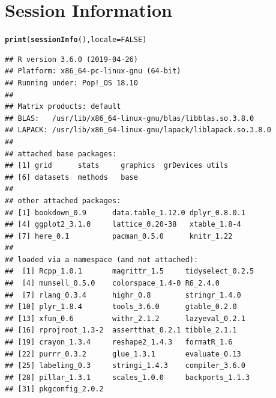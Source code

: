\documentclass[11pt,letter]{article}\usepackage[]{graphicx}\usepackage[]{color}
\makeatletter
\newcommand{\hlnum}[1]{\textcolor[rgb]{0.686,0.059,0.569}{#1}}%
\newcommand{\hlstd}[1]{\textcolor[rgb]{0.345,0.345,0.345}{#1}}%
\newcommand{\hlkwc}[1]{\textcolor[rgb]{0.333,0.667,0.333}{#1}}%
\newcommand{\hlkwd}[1]{\textcolor[rgb]{0.737,0.353,0.396}{\textbf{#1}}}%
\newenvironment{kframe}{%
 \def\at@end@of@kframe{}%
 \ifinner\ifhmode%
  \def\at@end@of@kframe{\end{minipage}}%
  \begin{minipage}{\columnwidth}%
 \fi\fi%
 \def\FrameCommand##1{\hskip\@totalleftmargin \hskip-\fboxsep
 \colorbox{shadecolor}{##1}\hskip-\fboxsep
     \hskip-\linewidth \hskip-\@totalleftmargin \hskip\columnwidth}%
 \MakeFramed {\advance\hsize-\width
   \@totalleftmargin\z@ \linewidth\hsize
   \@setminipage}}%
 {\par\unskip\endMakeFramed%
 \at@end@of@kframe}
\newenvironment{knitrout}{}{} %
\makeatother
\begin{document}
\newpage

\section{Session Information}
\begin{knitrout}
\color{fgcolor}\begin{kframe}
\begin{alltt}
\hlkwd{print}\hlstd{(}\hlkwd{sessionInfo}\hlstd{(),} \hlkwc{locale} \hlstd{=} \hlnum{FALSE}\hlstd{)}
\end{alltt}
\begin{verbatim}
## R version 3.6.0 (2019-04-26)
## Platform: x86_64-pc-linux-gnu (64-bit)
## Running under: Pop!_OS 18.10
## 
## Matrix products: default
## BLAS:   /usr/lib/x86_64-linux-gnu/blas/libblas.so.3.8.0
## LAPACK: /usr/lib/x86_64-linux-gnu/lapack/liblapack.so.3.8.0
## 
## attached base packages:
## [1] grid      stats     graphics  grDevices utils    
## [6] datasets  methods   base     
## 
## other attached packages:
## [1] bookdown_0.9      data.table_1.12.0 dplyr_0.8.0.1    
## [4] ggplot2_3.1.0     lattice_0.20-38   xtable_1.8-4     
## [7] here_0.1          pacman_0.5.0      knitr_1.22       
## 
## loaded via a namespace (and not attached):
##  [1] Rcpp_1.0.1       magrittr_1.5     tidyselect_0.2.5
##  [4] munsell_0.5.0    colorspace_1.4-0 R6_2.4.0        
##  [7] rlang_0.3.4      highr_0.8        stringr_1.4.0   
## [10] plyr_1.8.4       tools_3.6.0      gtable_0.2.0    
## [13] xfun_0.6         withr_2.1.2      lazyeval_0.2.1  
## [16] rprojroot_1.3-2  assertthat_0.2.1 tibble_2.1.1    
## [19] crayon_1.3.4     reshape2_1.4.3   formatR_1.6     
## [22] purrr_0.3.2      glue_1.3.1       evaluate_0.13   
## [25] labeling_0.3     stringi_1.4.3    compiler_3.6.0  
## [28] pillar_1.3.1     scales_1.0.0     backports_1.1.3 
## [31] pkgconfig_2.0.2
\end{verbatim}
\end{kframe}
\end{knitrout}
\end{document}
